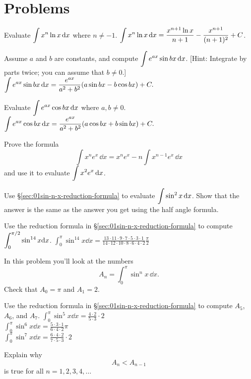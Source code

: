 \section{Problems} %
\label{sec:integration-by-parts-problems}
\problemfont %
\begin{multicols}{2}
\problem Evaluate $\displaystyle \int x^n \ln x\,\mathrm{d} x$ where $n\ne-1$. %
\answer %
$\displaystyle \int x^n \ln x\,\mathrm{d} x
= \frac{x^{n+1}\ln x}{n+1} - \frac{x^{n+1}}{(n+1)^2}+C$.
\endanswer

\problem\label{pblm:integral-eax-sinbx} Assume $a$ and $b$ are constants, and %
compute $\displaystyle \int e^{ax}\sin bx\,\mathrm{d} x$.  [Hint: Integrate by parts twice; you
can assume that $b\neq0$.]
\answer %
$\displaystyle\int e^{ax}\sin bx\,\mathrm{d} x= \frac{e^{ax}}{a^2+b^2}(a\sin bx
-b\cos bx)+C.$
\endanswer

\problem Evaluate $\displaystyle\int e^{ax}\cos bx\,\mathrm{d} x$ where $a, b\ne 0$. %
\answer %
$\displaystyle\int e^{ax}\cos bx\,\mathrm{d} x
= \frac{e^{ax}}{a^2+b^2}(a\cos bx+b\sin bx)+C.$
\endanswer



\problem Prove the formula %
\[
\int x^n e^x\,\dd x= x^ne^x-n\int x^{n-1}e^x\,\dd x
\]
and use it to evaluate $\displaystyle\int x^2e^x\,\mathrm{d} x$.

\problem Use \S\ref{sec:01sin-n-x-reduction-formula} to evaluate %
$\displaystyle\int\sin^2x\,\mathrm{d} x$.  Show that the answer is the same as the answer you get
using the half angle formula.

\problem Use the reduction formula in \S\ref{sec:01sin-n-x-reduction-formula} to %
compute $\displaystyle \int_0^{\pi/2} \sin^{14}x \mathrm{d} x$.
\answer %
$\int_0^{\pi} \sin^{14}x \dd x = \frac{13\cdot11\cdot9\cdot7\cdot5\cdot3\cdot1 }
{14\cdot12\cdot10\cdot8\cdot6\cdot4\cdot2}\frac{\pi}{2}$
\endanswer

\problem In this problem you'll look at the numbers  %
\[
A_n = \int_0^\pi \sin^n x \, \dd x.
\]
\subprob Check that $A_0 = \pi$ and $A_1 = 2$.

\subprob
Use the reduction formula in \S\ref{sec:01sin-n-x-reduction-formula} to
compute  $A_5$, $A_6$, and $A_7$.
\answer %
$\int_0^\pi \sin^5x \dd x = \frac{4\cdot2}{5\cdot3}\cdot2$\\
$\int_0^{\pi} \sin^{6}x \dd x = \frac{5\cdot3\cdot1 }
{6\cdot4\cdot2}\pi$\\
$\int_0^\pi \sin^7x \dd x = \frac{6\cdot4\cdot2}{7\cdot5\cdot3}\cdot2$
\endanswer

\subprob  Explain why
\[
A_n < A_{n-1} 
\]
is true for all $n=1, 2, 3, 4, \ldots$


\end{multicols}
